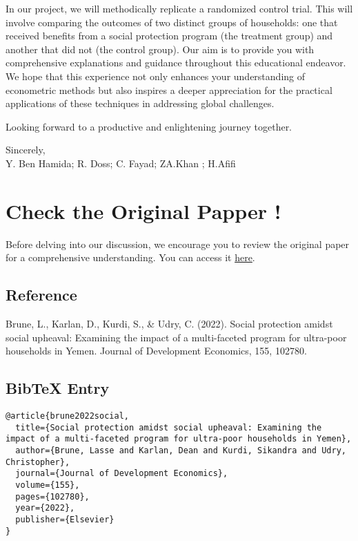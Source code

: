 \documentclass{article}
\begin{document}
\vspace{0.1cm}In our project, we will methodically replicate a randomized control trial. This will involve comparing the outcomes of two distinct groups of households: one that received benefits from a social protection program (the treatment group) and another that did not (the control group). \newline
Our aim is to provide you with comprehensive explanations and guidance throughout this educational endeavor. We hope that this experience not only enhances your understanding of econometric methods but also inspires a deeper appreciation for the practical applications of these techniques in addressing global challenges.\newline

\vspace{0.3cm}Looking forward to a productive and enlightening journey together.\vspace{0.5cm} 

\vspace{0.5cm}
\noindent
Sincerely,\\
\vspace{2cm} %
Y. Ben Hamida; R. Doss; C. Fayad; ZA.Khan ; H.Afifi

\newpage
\tableofcontents


\section*{Check the Original Papper !}

Before delving into our discussion, we encourage you to review the original paper for a comprehensive understanding. You can access it \href{https://www.sciencedirect.com/science/article/pii/S0304387821001395}{here}.

\subsection*{Reference}
Brune, L., Karlan, D., Kurdi, S., \& Udry, C. (2022). Social protection amidst social upheaval: Examining the impact of a multi-faceted program for ultra-poor households in Yemen. Journal of Development Economics, 155, 102780.

\subsection*{BibTeX Entry}
\begin{verbatim}
@article{brune2022social,
  title={Social protection amidst social upheaval: Examining the impact of a multi-faceted program for ultra-poor households in Yemen},
  author={Brune, Lasse and Karlan, Dean and Kurdi, Sikandra and Udry, Christopher},
  journal={Journal of Development Economics},
  volume={155},
  pages={102780},
  year={2022},
  publisher={Elsevier}
}
\end{verbatim}
\end{document}
